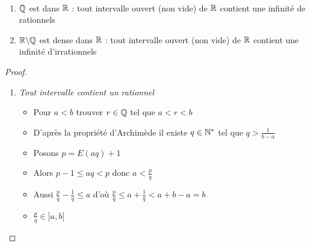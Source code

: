 \begin{frame}
	\begin{theoreme}\ 
\begin{enumerate}
  \item $\mathbb{Q}$ est  dans $\mathbb{R}$ : 
tout intervalle ouvert (non vide) de $\mathbb{R}$ contient une infinité de rationnels
\pause
  \item $\mathbb{R}\backslash\mathbb{Q}$ est dense dans $\mathbb{R}$ : 
tout intervalle ouvert (non vide) de $\mathbb{R}$ contient une infinité d'irrationnels
\end{enumerate}
\end{theoreme}

\pause

\begin{proof}
\begin{enumerate}
  \item \emph{Tout intervalle contient un rationnel}
\pause
  \begin{itemize}[<+->]
    \item Pour $a<b$ trouver $r\in \mathbb{Q}$ tel que $a<r<b$
    \item D'après la propriété d'Archimède il existe $q\in \mathbb{N}^*$ tel que $q>\frac{1}{b-a}$
    \item Posons $p=E(aq)+1$ 
    \item Alors $p-1\leq aq<p$ donc $a<\frac pq$ 
    \item Aussi $\frac pq- \frac 1q\leq a$ d'où $\frac pq \leq a+\frac 1q < a+b-a=b$
    \item $\frac pq\in ]a,b[$
  \end{itemize}
\setcounter{saveenumi}{\theenumi}
\end{enumerate}
\end{proof}
\end{frame}


